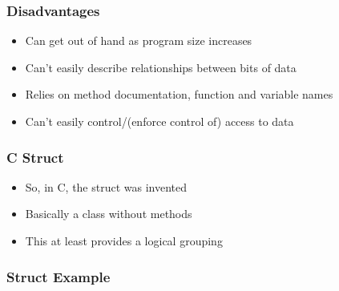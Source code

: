 \begin{Shaded}
\begin{Highlighting}[]

\NormalTok{\{}
\NormalTok{\}}

\NormalTok{\{}
\NormalTok{\}}

\NormalTok{\{}
\NormalTok{\}}
\end{Highlighting}
\end{Shaded}

\hypertarget{disadvantages}{%
\subsubsection{Disadvantages}\label{disadvantages}}

\begin{itemize}
\tightlist
\item
  Can get out of hand as program size increases
\item
  Can't easily describe relationships between bits of data
\item
  Relies on method documentation, function and variable names
\item
  Can't easily control/(enforce control of) access to data
\end{itemize}

\hypertarget{c-struct}{%
\subsubsection{C Struct}\label{c-struct}}

\begin{itemize}
\tightlist
\item
  So, in C, the struct was invented
\item
  Basically a class without methods
\item
  This at least provides a logical grouping
\end{itemize}

\hypertarget{struct-example}{%
\subsubsection{Struct Example}\label{struct-example}}

